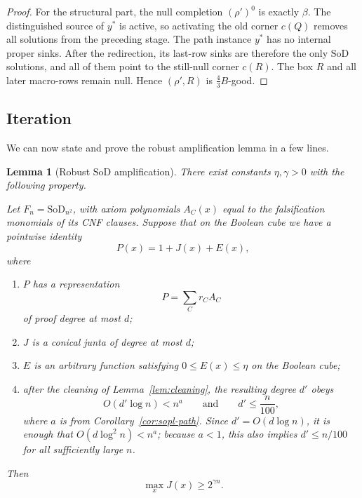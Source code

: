 \documentclass[11pt]{article}
\newtheorem{lemma}[theorem]{Lemma}
\theoremstyle{definition}
\newcommand{\SoD}{\mathrm{SoD}}
\begin{document}
\begin{proof}
For the structural part, the null completion $(\rho')^0$ is exactly $\beta$.  The
distinguished source of $y^*$ is active, so activating the old corner $c(Q)$ removes
all solutions from the preceding stage.  The path instance $y^*$ has no internal
proper sinks.  After the redirection, its last-row sinks are therefore the only
$\SoD$ solutions, and all of them point to the still-null corner $c(R)$.  The box $R$
and all later macro-rows remain null.  Hence $(\rho',R)$ is $\frac43B$-good.
\end{proof}

\subsection{Iteration}

We can now state and prove the robust amplification lemma in a few lines.

\begin{lemma}[Robust $\SoD$ amplification]\label{lem:robust-sod}
There exist constants $\eta,\gamma>0$ with the following property.

Let $F_n=\SoD_{n^2}$, with axiom polynomials $A_C(x)$ equal to the falsification
monomials of its CNF clauses.  Suppose that on the Boolean cube we have a pointwise
identity
\[
  P(x)=1+J(x)+E(x),
  \tag{6.6}\label{eq:robust-id}
\]
where
\begin{enumerate}[label=(\alph*)]
\item $P$ has a representation
\[
  P=\sum_C r_CA_C
\]
of proof degree at most $d$;
\item $J$ is a conical junta of degree at most $d$;
\item $E$ is an arbitrary function satisfying $0\le E(x)\le\eta$ on the Boolean cube;
\item after the cleaning of Lemma~\ref{lem:cleaning}, the resulting degree $d'$ obeys
\[
  O(d'\log n)<n^a
  \qquad\text{and}\qquad
  d'\le \frac n{100},
  \tag{6.7}\label{eq:degree-embed-condition}
\]
where $a$ is from Corollary~\ref{cor:sopl-path}.  Since $d'=O(d\log n)$, it is enough
that $O(d\log^2n)<n^a$; because $a<1$, this also implies $d'\le n/100$ for all
sufficiently large $n$.
\end{enumerate}
Then
\[
  \max_xJ(x)\ge2^{\gamma n}.
  \tag{6.8}\label{eq:Jlarge}
\]
\end{lemma}
\end{document}
